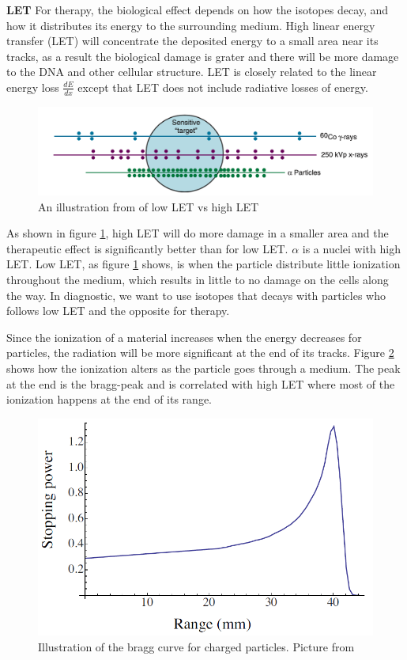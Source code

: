 \documentclass[twoside,english]{uiofysmaster/uiofysmaster}
\begin{document}
\noindent
\textbf{LET}
For therapy, the biological effect depends on how the isotopes decay, and how it distributes its energy to the surrounding medium. High linear energy transfer (LET) will concentrate the deposited energy to a small area near its tracks, as a result the biological damage is grater and there will be more damage to the DNA and other cellular structure. LET is closely related to the linear energy loss $\frac{dE}{dx}$ except that LET does not include radiative losses of energy. 
\begin{figure}[h]
    \centering
    \includegraphics[scale=.4]{low_vs_high_LET.PNG}
    \caption{An illustration from \cite{Zeman2015_chap1} of low LET vs high LET}
    \label{fig:higvslowLET}
\end{figure}

As shown in figure \ref{fig:higvslowLET}, high LET will do more damage in a smaller area and the therapeutic effect is significantly better than for low LET. $\alpha$ is a nuclei with high LET. 
Low LET, as figure \ref{fig:higvslowLET} shows, is when the particle distribute little ionization throughout the medium, which results in little to no damage on the cells along the way. In diagnostic, we want to use isotopes that decays with particles who follows low LET and the opposite for therapy.

Since the ionization of a material increases when the energy decreases for particles\cite{Nuclear_medicine}, the radiation will be more significant at the end of its tracks. Figure \ref{fig:braggcurve} shows how the ionization alters as the particle goes through a medium. The peak at the end is the bragg-peak and is correlated with high LET where most of the ionization happens at the end of its range. 

\begin{figure}[h!]
    \centering
    \includegraphics[scale=.25]{bragg.png}
    \caption{Illustration of the bragg curve for charged particles. Picture from \cite{inbook}}
    \label{fig:braggcurve}
\end{figure}
\end{document}

